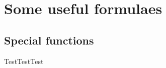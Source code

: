 \begin{comment}
\documentclass[11pt]{article}  %
\usepackage{Common/toshi}

\end{comment}




\section{Some useful formulaes}

\subsection{Special functions}

TestTestTest




